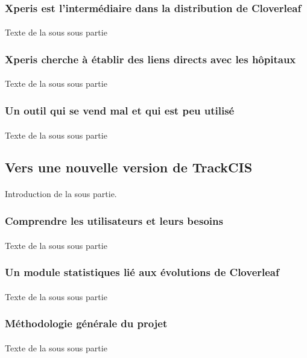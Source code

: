 		\subsubsection{Xperis est l'intermédiaire dans la distribution de Cloverleaf}
			\paragraph{}
			Texte de la sous sous partie
		\subsubsection{Xperis cherche à établir des liens directs avec les hôpitaux}
			\paragraph{}
			Texte de la sous sous partie
		\subsubsection{Un outil qui se vend mal et qui est peu utilisé}
			\paragraph{}
			Texte de la sous sous partie
	
	\subsection{Vers une nouvelle version de TrackCIS}
		\paragraph{}
		Introduction de la sous partie.
		
		\subsubsection{Comprendre les utilisateurs et leurs besoins}
			\paragraph{}
			Texte de la sous sous partie
		\subsubsection{Un module statistiques lié aux évolutions de Cloverleaf}
			\paragraph{}
			Texte de la sous sous partie
		\subsubsection{Méthodologie générale du projet}
			\paragraph{}
			Texte de la sous sous partie
			